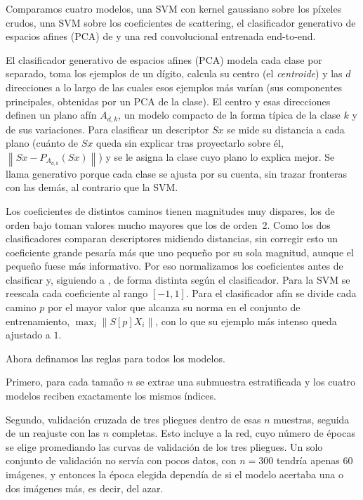 \documentclass[twocolumn,10pt,a4paper]{article}
\newcommand{\norm}[1]{\left\lVert #1 \right\rVert}
\begin{document}
Comparamos cuatro modelos, una SVM con kernel gaussiano sobre los píxeles
crudos, una SVM sobre los coeficientes de scattering, el clasificador generativo
de espacios afines (PCA) de \cite{bruna2013} y una red convolucional entrenada
end-to-end.

El clasificador generativo de espacios afines (PCA) modela cada clase por
separado, toma los ejemplos de un dígito, calcula su centro (el \emph{centroide})
y las $d$ direcciones a lo largo de las cuales esos ejemplos más varían (sus
componentes principales, obtenidas por un PCA de la clase). El centro y esas direcciones definen un plano
afín $A_{d,k}$, un modelo compacto de la forma típica de la clase $k$ y de sus
variaciones. Para clasificar un descriptor $S x$ se mide su distancia a cada
plano (cuánto de $S x$ queda sin explicar tras proyectarlo sobre él,
$\norm{S x - P_{A_{d,k}}(S x)}$) y se le asigna la clase cuyo plano lo explica
mejor. Se llama generativo porque cada clase se ajusta por su cuenta, sin
trazar fronteras con las demás, al contrario que la SVM.

Los coeficientes de distintos caminos tienen magnitudes muy dispares, los de
orden bajo toman valores mucho mayores que los de orden~2. Como los dos
clasificadores comparan descriptores midiendo distancias, sin corregir esto un
coeficiente grande pesaría más que uno pequeño por su sola magnitud, aunque el
pequeño fuese más informativo. Por eso normalizamos los coeficientes antes de
clasificar y, siguiendo a \cite{bruna2013}, de forma distinta según el
clasificador. Para la SVM se reescala cada coeficiente al rango $[-1,1]$. Para el
clasificador afín se divide cada camino $p$ por el mayor valor que alcanza su
norma en el conjunto de entrenamiento, $\max_i \norm{S[p]X_i}$, con lo que su
ejemplo más intenso queda ajustado a $1$.

Ahora definamos las reglas para todos los modelos.

Primero, para cada tamaño $n$ se extrae una
submuestra estratificada y los cuatro modelos reciben exactamente los mismos
índices.

Segundo, validación cruzada de
tres pliegues dentro de esas $n$ muestras, seguida de un reajuste con las $n$
completas. Esto incluye a la red, cuyo número de épocas se elige promediando las
curvas de validación de los tres pliegues. Un solo conjunto de validación no
servía con pocos datos, con $n=300$ tendría apenas $60$ imágenes, y entonces la
época elegida dependía de si el modelo acertaba una o dos imágenes más, es decir,
del azar.
\end{document}
